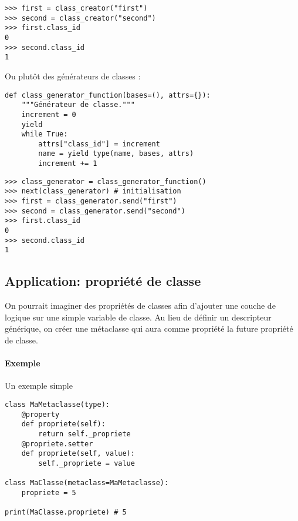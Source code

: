 \begin{verbatim}
>>> first = class_creator("first")
>>> second = class_creator("second")
>>> first.class_id
0
>>> second.class_id
1
\end{verbatim}

Ou plutôt des générateurs de classes :

\begin{verbatim}
def class_generator_function(bases=(), attrs={}):
    """Générateur de classe."""
    increment = 0
    yield
    while True:
        attrs["class_id"] = increment
        name = yield type(name, bases, attrs)
        increment += 1
\end{verbatim}

\begin{verbatim}
>>> class_generator = class_generator_function()
>>> next(class_generator) # initialisation
>>> first = class_generator.send("first")
>>> second = class_generator.send("second")
>>> first.class_id
0
>>> second.class_id
1
\end{verbatim}

\subsection{Application: propriété de classe}
On pourrait imaginer des propriétés de classes afin d'ajouter une couche de logique sur une simple variable de classe. Au lieu de définir un descripteur générique, on créer une métaclasse qui aura comme propriété la future propriété de classe.

\paragraph{Exemple} Un exemple simple
\begin{verbatim}
class MaMetaclasse(type):
    @property
    def propriete(self):
        return self._propriete
    @propriete.setter
    def propriete(self, value):
        self._propriete = value

class MaClasse(metaclass=MaMetaclasse):
    propriete = 5

print(MaClasse.propriete) # 5
\end{verbatim}
